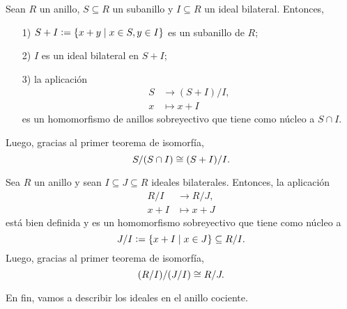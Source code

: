 \begin{teorema}
  Sean $R$ un anillo, $S \subseteq R$ un subanillo y $I \subseteq R$ un ideal
  bilateral. Entonces,

  \begin{enumerate}
  \item[1)] $S + I \mathrel{\mathop:}= \{ x + y \mid x\in S, y\in I \}$ es un subanillo de $R$;

  \item[2)] $I$ es un ideal bilateral en $S + I$;

  \item[3)] la aplicación
    \begin{align*}
      S & \to (S + I)/I,\\
      x & \mapsto x + I
    \end{align*}
    es un homomorfismo de anillos sobreyectivo que tiene como núcleo
    a $S \cap I$.
  \end{enumerate}

  Luego, gracias al primer teorema de isomorfía,
  $$S/(S\cap I) \cong (S + I)/I.$$
\end{teorema}

\begin{teorema}
  Sea $R$ un anillo y sean $I \subseteq J \subseteq R$ ideales
  bilaterales. Entonces, la aplicación
  \begin{align*}
    R/I & \to R/J,\\
    x + I & \mapsto x + J
  \end{align*}
  está bien definida y es un homomorfismo sobreyectivo que tiene como núcleo a
  $$J/I \mathrel{\mathop:}= \{ x + I \mid x\in J \} \subseteq R/I.$$
  Luego, gracias al primer teorema de isomorfía,
  $$(R/I)/(J/I) \cong R/J.$$
\end{teorema}

En fin, vamos a describir los ideales en el anillo cociente.

